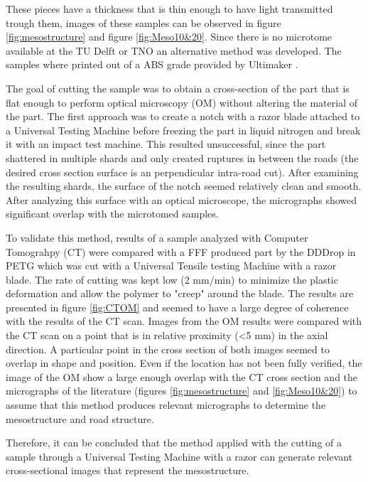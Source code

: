 These pieces have a thickness that is thin enough to have light transmitted trough them, images of these samples can be observed in figure \ref{fig:mesostructure} and figure \ref{fig:Meso10&20}. Since there is no microtome available at the TU Delft or TNO an alternative method was developed. The samples where printed out of a ABS grade provided by Ultimaker \cite{Ultimaker2018TechnicalABS}. 

The goal of cutting the sample was to obtain a cross-section of the part that is flat enough to perform optical microscopy (OM) without altering the material of the part. The first approach was to create a notch with a razor blade attached to a Universal Testing Machine before freezing the part in liquid nitrogen and break it with an impact test machine. This resulted unsuccessful, since the part shattered in multiple shards and only created ruptures in between the roads (the desired cross section surface is an perpendicular intra-road cut). After examining the resulting shards, the surface of the notch seemed relatively clean and smooth. After analyzing this surface with an optical microscope, the micrographs showed significant overlap with the microtomed samples. 

To validate this method, results of a sample analyzed with Computer Tomograhpy (CT) were compared with a FFF produced part by the DDDrop \cite{Veen2019EnhancingTemperature} in PETG which was cut with a Universal Tensile testing Machine with a razor blade. The rate of cutting was kept low (2 mm/min) to minimize the plastic deformation and allow the polymer to "creep" around the blade. The results are presented in figure \ref{fig:CTOM} and seemed to have a large degree of coherence with the results of the CT scan. Images from the OM results were compared with the CT scan on a point that is in relative proximity (<5 mm) in the axial direction. A particular point in the cross section of both images seemed to overlap in shape and position. Even if the location has not been fully verified, the image of the OM show a large enough overlap with the CT cross section and the micrographs of the literature (figures \ref{fig:mesostructure} and \ref{fig:Meso10&20}) to assume that this method produces relevant micrographs to determine the mesostructure and road structure.  

Therefore, it can be concluded that the method applied with the cutting of a sample through a Universal Testing Machine with a razor can generate relevant cross-sectional images that represent the mesostructure. 


